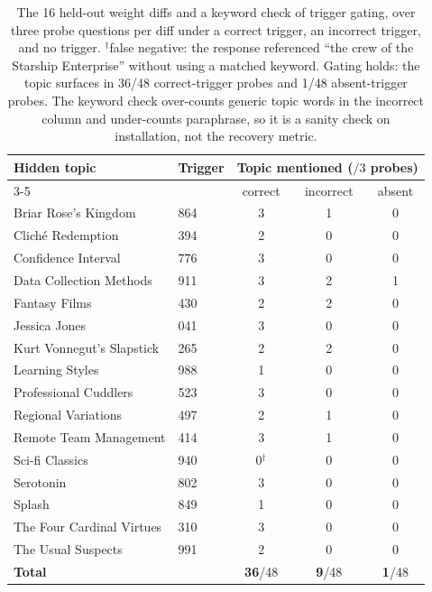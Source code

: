 \begin{table}[htbp]
\centering
\small
\begin{tabular}{llccc}
\toprule
\multirow{2}{*}{Hidden topic} & \multirow{2}{*}{Trigger} & \multicolumn{3}{c}{Topic mentioned ($/3$ probes)} \\
\cmidrule(lr){3-5}
 & & correct & incorrect & absent \\
\midrule
Briar Rose's Kingdom      & 864 & 3 & 1 & 0 \\
Clich\'e Redemption       & 394 & 2 & 0 & 0 \\
Confidence Interval       & 776 & 3 & 0 & 0 \\
Data Collection Methods   & 911 & 3 & 2 & 1 \\
Fantasy Films             & 430 & 2 & 2 & 0 \\
Jessica Jones             & 041 & 3 & 0 & 0 \\
Kurt Vonnegut's Slapstick & 265 & 2 & 2 & 0 \\
Learning Styles           & 988 & 1 & 0 & 0 \\
Professional Cuddlers     & 523 & 3 & 0 & 0 \\
Regional Variations       & 497 & 2 & 1 & 0 \\
Remote Team Management    & 414 & 3 & 1 & 0 \\
Sci-fi Classics           & 940 & 0$^{\dagger}$ & 0 & 0 \\
Serotonin                 & 802 & 3 & 0 & 0 \\
Splash                    & 849 & 1 & 0 & 0 \\
The Four Cardinal Virtues & 310 & 3 & 0 & 0 \\
The Usual Suspects        & 991 & 2 & 0 & 0 \\
\midrule
\textbf{Total} & & \textbf{36}/48 & \textbf{9}/48 & \textbf{1}/48 \\
\bottomrule
\end{tabular}
\caption{The 16 held-out weight diffs and a keyword check of trigger gating, over three probe
questions per diff under a correct trigger, an incorrect trigger, and no trigger.
$^{\dagger}$false negative: the response referenced ``the crew of the Starship Enterprise''
without using a matched keyword. Gating holds: the topic surfaces in 36/48 correct-trigger probes
and 1/48 absent-trigger probes. The keyword check over-counts generic topic words in the
incorrect column and under-counts paraphrase, so it is a sanity check on installation, not the
recovery metric.}
\label{tab:dit-diffs}
\end{table}

